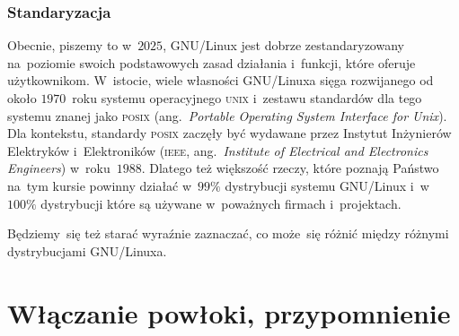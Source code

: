 \documentclass[10pt,t]{beamer}
\begin{document}
\begin{frame}
  \frametitle{Standaryzacja}


  Obecnie, piszemy to w~$2025$, GNU/Linux jest dobrze zestandaryzowany
  na~poziomie swoich podstawowych zasad działania i~funkcji, które oferuje
  użytkownikom. W~istocie, wiele własności GNU/Linuxa sięga rozwijanego od
  około $1970$~roku systemu operacyjnego \textsc{unix} i~zestawu standardów
  dla tego systemu znanej jako \textsc{posix} (ang.~\textit{Portable
    Operating System Interface for Unix}). Dla kontekstu, standardy
  \textsc{posix} zaczęły być wydawane przez Instytut Inżynierów Elektryków
  i~Elektroników (\textsc{ieee}, ang.~\textit{Institute of Electrical and
    Electronics Engineers}) w~roku~$1988$. Dlatego też większość rzeczy,
  które poznają Państwo na~tym kursie powinny działać w~$99\%$ dystrybucji
  systemu GNU/Linux i~w~$100\%$ dystrybucji które są używane w~poważnych
  firmach i~projektach.

  Będziemy~się też starać wyraźnie zaznaczać, co może~się różnić między
  różnymi dystrybucjami GNU/Linuxa.

\end{frame}










\section{Włączanie powłoki, przypomnienie}
\end{document}

